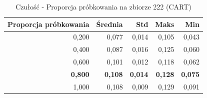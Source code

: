\begin{table}[htbp]
\centering
\small
\setlength{\tabcolsep}{6pt}
\renewcommand{\arraystretch}{1.2}
\caption{Czułość - Proporcja próbkowania na zbiorze 222 (CART)}
\label{tab:CART_sample_ratio_222_recall}
\begin{tabular}{r|r|r|r|r}
\toprule
Proporcja próbkowania & Średnia & Std & Maks & Min \\
\hline
0,200 & 0,077 & 0,014 & 0,105 & 0,043 \\
0,400 & 0,087 & 0,016 & 0,125 & 0,060 \\
0,600 & 0,101 & 0,012 & 0,118 & 0,062 \\
\textbf{0,800} & \textbf{0,108} & \textbf{0,014} & \textbf{0,128} & \textbf{0,075} \\
1,000 & 0,108 & 0,009 & 0,129 & 0,091 \\
\bottomrule
\end{tabular}
\end{table}